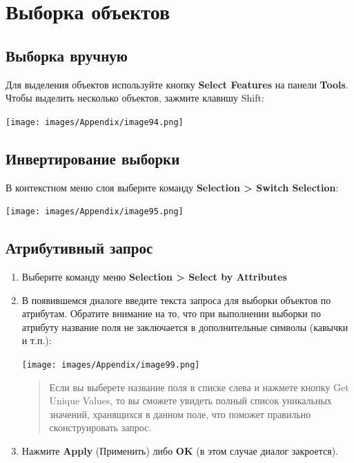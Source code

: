 \documentclass[12pt,]{book}
\begin{document}
\hypertarget{manual-select}{%
\chapter{Выборка объектов}\label{manual-select}}

\hypertarget{manual-select-manual}{%
\section{Выборка вручную}\label{manual-select-manual}}

Для выделения объектов используйте кнопку \textbf{Select Features} на панели \textbf{Tools}. Чтобы выделить несколько объектов, зажмите клавишу Shift:

\texttt{[image: images/Appendix/image94.png]}

\hypertarget{manual-select-invert}{%
\section{Инвертирование выборки}\label{manual-select-invert}}

В контекстном меню слоя выберите команду \textbf{Selection \textgreater{} Switch Selection}:

\texttt{[image: images/Appendix/image95.png]}

\hypertarget{manual-select-attribute}{%
\section{Атрибутивный запрос}\label{manual-select-attribute}}

\begin{enumerate}
\def\labelenumi{\arabic{enumi}.}
\item
  Выберите команду меню \textbf{Selection \textgreater{} Select by Attributes}
\item
  В появившемся диалоге введите текста запроса для выборки объектов по атрибутам. Обратите внимание на то, что при выполнении выборки по атрибуту название поля не заключается в дополнительные символы (кавычки и т.п.):

  \texttt{[image: images/Appendix/image99.png]}

  \begin{quote}
  Если вы выберете название поля в списке слева и нажмете кнопку Get Unique Values, то вы сможете увидеть полный список уникальных значений, хранящихся в данном поле, что поможет правильно сконструировать запрос.
  \end{quote}
\item
  Нажмите \textbf{Apply} (Применить) либо \textbf{OK} (в этом случае диалог закроется).
\end{enumerate}
\end{document}
